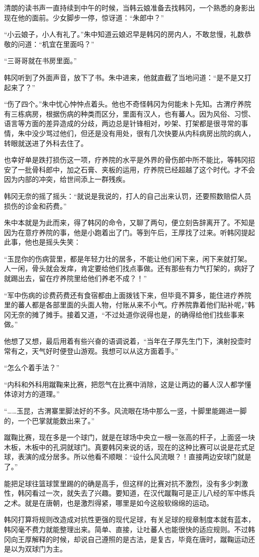 清朗的读书声一直持续到中午的时候，当韩云娘准备去找韩冈，一个熟悉的身影出现在他的面前。少女脚步一停，惊讶道：“朱郎中？”

“小云娘子，小人有礼了。”朱中知道云娘迟早是韩冈的房内人，不敢怠慢，礼数恭敬的问道：“机宜在里面吗？”

“三哥哥就在书房里面。”

韩冈听到了外面声音，放下了书。朱中进来，他就直截了当地问道：“是不是又打起来了？”

“伤了四个。”朱中忧心忡忡点着头。他也不奇怪韩冈为何能未卜先知。古渭疗养院有三栋病房，根据伤病的种类而区分，里面有汉人，也有蕃人。因为风俗、习惯、语言等方面的差异造成的分歧，两边总是针锋相对，吵架、打架都是很寻常的事情，朱中没少骂过他们，但还是没有用处，很有几次快要从内科病房出院的病人，转眼就送进了外科去住了。

也幸好单是跌打损伤这一项，疗养院的水平是外界的骨伤郎中所不能比，等韩冈招安了一批骨科郎中，加之石膏、夹板的运用，疗养院已经超越了这个时代。才不会因为内部的冲突，给世间添上一群残疾。

韩冈无奈的摇了摇头：“就说是我说的，打人的自己出来认罚，还要照数赔偿人员损伤的诊金和药费。”

朱中本就是为此而来，得了韩冈的命令，又聊了两句，便立刻告辞离开了。不知是因为在意疗养院的事，他是小跑着出了门。等到午后，王厚找了过来。听韩冈提起此事，他也是摇头失笑：

“玉昆你的伤病营里，都是年轻力壮的居多，不能让他们闲下来，闲下来就打架。人一闲，骨头就会发痒，肯定要给他们找点事做。还有那些有力气打架的，病好了就踢出去，留在疗养院里给他们养老不成？！”

“军中伤病的诊费药费还有食宿都由上面拨钱下来，但毕竟不算多，能住进疗养院里的蕃人都是各部里面的头面人物，付账从来不小气。疗养院靠着他们贴补呢，”韩冈无奈的摊了摊手。接着又道，“不过处道你说得也是，的确得给他们找些事来做。”

他想了又想，最后用着有些兴奋的语调说着，“当年在子厚先生门下，演射投壶时常有之，天气好时便登山游观。我想可以从这方面着手。”

“怎么个着手法？”

“内科和外科用蹴鞠来比赛，把怨气在比赛中消除，这是让两边的蕃人汉人都学懂体谅对方的道理。”

“……玉昆，古渭寨里脚法好的不多。风流眼在场中那么一竖，十脚里能踢进一脚的，一个巴掌就能数出来了。”

蹴鞠比赛，现在多是一个球门，就是在球场中央立一根一张高的杆子，上面竖一块木板，木板中的孔洞就球门。真要韩冈来说的话，现在的这种比赛可以说是花式足球，表演的成分居多。所以他看不顺眼：“设什么风流眼？！直接两边安球门就是了。”

能把足球往篮球筐里踢的的确是高手，但这样的比赛对抗不激烈，没有多少刺激性，韩冈看过一次，就失去了兴趣。要知道，在汉代蹴鞠可是正儿八经的军中练兵之术。就是在唐朝，也是激烈得紧，哪里是如今这般软绵绵的运动。

韩冈打算将规则改造成对抗性更强的现代足球，有关足球的规章制度本就有蓝本，韩冈毫不费力就能整理出来。简单、直接，让吐蕃人也能很快的适应规则。不过韩冈向王厚解释的时候，却说自己遵照的是古法，是复古，毕竟在唐时，蹴鞠运动还是以为双球门为主。


